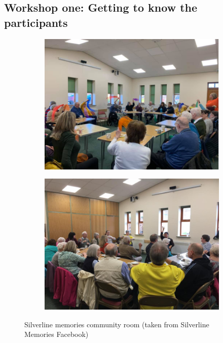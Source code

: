 \subsection{Workshop one: Getting to know the participants}
\label{StudyOne:W1}
\begin{figure}[htp]
\centering
\begin{subfigure}{.5\textwidth}
  \centering
  \includegraphics[width=.8\linewidth]{Images/ChapterFour/SilverlineCommunityRoomOne.png}
  \label{fig:communityRoomOne}
\end{subfigure}%
\begin{subfigure}{.5\textwidth}
  \centering
  \includegraphics[width=.8\linewidth]{Images/ChapterFour/SilverlineMemoriesCommunityRoomTwo.png}
  \label{fig:communityRoomTwo}
\end{subfigure}
\caption{Silverline memories community room (taken from Silverline Memories Facebook)}
\label{fig:SilverlineCommunityRoom}
\end{figure}

